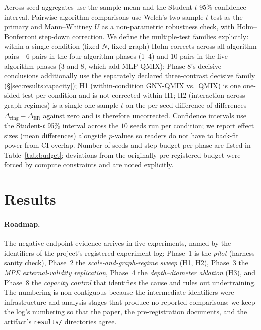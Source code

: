 \documentclass[10pt]{article}
\newcommand{\algoname}[1]{\textsc{#1}}
\newcommand{\mlpqmix}{\algoname{MLP-QMIX}}
\begin{document}
Across-seed aggregates use the sample mean and the Student-$t$ 95\%
confidence interval. Pairwise algorithm comparisons use Welch's two-sample
$t$-test as the primary and Mann--Whitney $U$ as a non-parametric
robustness check, with Holm--Bonferroni step-down correction. We define
the multiple-test families explicitly: within a single condition
(fixed $N$, fixed graph) Holm corrects across all algorithm pairs---6
pairs in the four-algorithm phases (1--4) and 10 pairs in the
five-algorithm phases (3 and 8, which add \mlpqmix); Phase 8's decisive
conclusions additionally use the separately declared three-contrast
decisive family (\S\ref{sec:results:capacity});
H1 (within-condition GNN-QMIX vs.\ QMIX) is one one-sided test per
condition and is not corrected within H1; H2 (interaction across
graph regimes) is a single one-sample $t$ on the per-seed
difference-of-differences $\Delta_{\text{ring}} - \Delta_{\text{ER}}$
against zero and is therefore uncorrected. Confidence intervals use the
Student-$t$ 95\% interval across the $10$ seeds run per condition; we report
effect sizes (mean differences) alongside $p$-values so readers do not have to
back-fit power from CI overlap. Number of seeds
and step budget per phase are listed in Table~\ref{tab:budget};
deviations from the originally pre-registered budget were forced by
compute constraints and are noted explicitly.

\section{Results}
\label{sec:results}

\paragraph{Roadmap.} The negative-endpoint evidence arrives in five
experiments, named by the identifiers of the project's registered experiment
log: Phase~1 is the \emph{pilot} (harness sanity check), Phase~2 the
\emph{scale-and-graph-regime sweep} (H1, H2), Phase~3 the \emph{MPE
external-validity replication}, Phase~4 the \emph{depth--diameter ablation}
(H3), and Phase~8 the \emph{capacity control} that identifies the cause and
rules out undertraining. The numbering is non-contiguous because the
intermediate identifiers were infrastructure and analysis stages that
produce no reported comparisons; we keep the log's numbering so that the
paper, the pre-registration documents, and the artifact's
\texttt{results/} directories agree.
\end{document}
